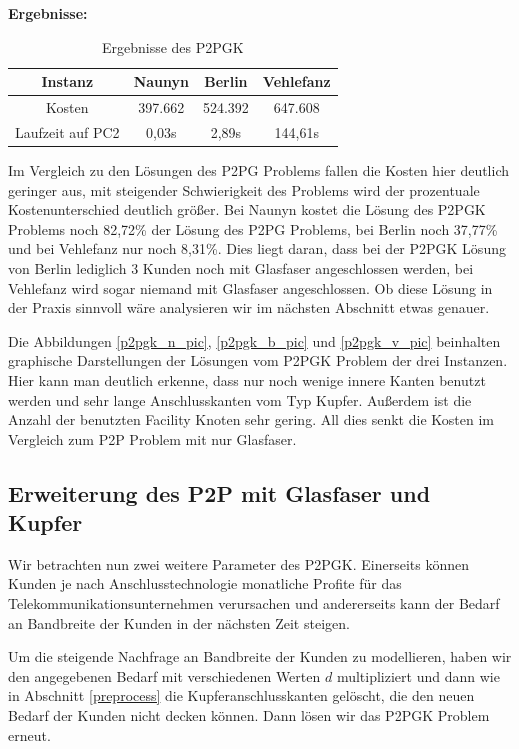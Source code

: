\documentclass[11pt,a4paper]{article}
\theoremstyle{my_th_style1}
\begin{document}
\textbf{Ergebnisse:}
\begin{table}[h]
	\centering
	\begin{tabular}{c|c|c|c}
		Instanz & Naunyn & Berlin & Vehlefanz \\	
		\hline
		Kosten & 397.662 & 524.392 & 647.608 \\
		Laufzeit auf PC2 & 0,03s & 2,89s & 144,61s \\
	\end{tabular}
	\label{P2PGK}
	\caption{Ergebnisse des P2PGK} 
\end{table}

Im Vergleich zu den L\"osungen des P2PG Problems fallen die Kosten hier deutlich geringer aus, mit steigender Schwierigkeit des Problems wird der prozentuale Kostenunterschied deutlich gr\"oßer.
Bei Naunyn kostet die L\"osung des P2PGK Problems noch 82,72\% der L\"osung des P2PG Problems, bei Berlin noch 37,77\% und bei Vehlefanz nur noch 8,31\%.
Dies liegt daran, dass bei der P2PGK L\"osung von Berlin lediglich 3 Kunden noch mit Glasfaser angeschlossen werden, bei Vehlefanz wird sogar niemand mit Glasfaser angeschlossen.
Ob diese L\"osung in der Praxis sinnvoll w\"are analysieren wir im n\"achsten Abschnitt etwas genauer.

Die Abbildungen \eqref{p2pgk_n_pic}, \eqref{p2pgk_b_pic} und \eqref{p2pgk_v_pic} beinhalten graphische Darstellungen der L\"osungen vom P2PGK Problem der drei Instanzen. Hier kann man deutlich erkenne, dass nur noch wenige innere Kanten benutzt werden und sehr lange Anschlusskanten vom Typ Kupfer. Außerdem ist die Anzahl der benutzten Facility Knoten sehr gering. All dies senkt die Kosten im Vergleich zum P2P Problem mit nur Glasfaser.

\subsection{Erweiterung des P2P mit Glasfaser und Kupfer}
\label{Erweiterung des P2PGK}

Wir betrachten nun zwei weitere Parameter des P2PGK.
Einerseits k\"onnen Kunden je nach Anschlusstechnologie monatliche Profite f\"ur das Telekommunikationsunternehmen verursachen und andererseits kann der Bedarf an Bandbreite der Kunden in der n\"achsten Zeit steigen.

Um die steigende Nachfrage an Bandbreite der Kunden zu modellieren, haben wir den angegebenen Bedarf mit verschiedenen Werten $d$ multipliziert und dann wie in Abschnitt \ref{preprocess} die Kupferanschlusskanten gelöscht, die den neuen Bedarf der Kunden nicht decken können.
Dann lösen wir das P2PGK Problem erneut. 
\end{document}
